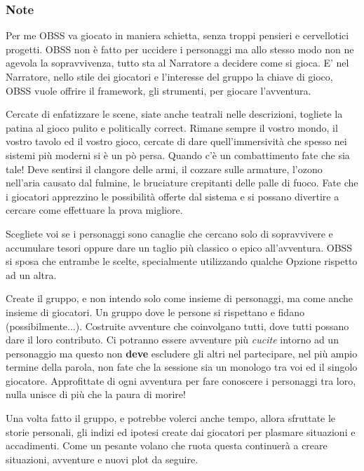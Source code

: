 \vfill
{\small

\begin{multicols}{2}

\subsubsection*{Note}

Per me OBSS va giocato in maniera schietta, senza troppi pensieri e cervellotici progetti. OBSS non è fatto per uccidere i personaggi ma allo stesso modo non ne agevola la sopravvivenza, tutto sta al Narratore a decidere come si gioca. E' nel Narratore, nello stile dei giocatori e l'interesse del gruppo la chiave di gioco, OBSS vuole offrire il framework, gli strumenti, per giocare l'avventura.

Cercate di enfatizzare le scene, siate anche teatrali nelle descrizioni, togliete la patina al gioco pulito e politically correct. Rimane sempre il vostro mondo, il vostro tavolo ed il vostro gioco, cercate di dare quell'immersività che spesso nei sistemi più moderni si è un pò persa.
Quando c'è un combattimento fate che sia tale! Deve sentirsi il clangore delle armi, il cozzare sulle armature, l'ozono nell'aria causato dal fulmine, le bruciature crepitanti delle palle di fuoco. Fate che i giocatori apprezzino le possibilità offerte dal sistema e si possano divertire a cercare come effettuare la prova migliore.

Scegliete voi se i personaggi sono canaglie che cercano solo di sopravvivere e accumulare tesori oppure dare un taglio più classico o epico all'avventura. OBSS si sposa che entrambe le scelte, specialmente utilizzando qualche Opzione rispetto ad un altra.

Create il gruppo, e non intendo solo come insieme di personaggi, ma come anche insieme di giocatori. Un gruppo dove le persone si rispettano e fidano (possibilmente...). Costruite avventure che coinvolgano tutti, dove tutti possano dare il loro contributo. Ci potranno essere avventure più \emph{cucite} intorno ad un personaggio ma questo non \textbf{deve} escludere gli altri nel partecipare, nel più ampio termine della parola, non fate che la sessione sia un monologo tra voi ed il singolo giocatore.
Approfittate di ogni avventura per fare conoscere i personaggi tra loro, nulla unisce di più che la paura di morire!

Una volta fatto il gruppo, e potrebbe volerci anche tempo, allora sfruttate le storie personali, gli indizi ed ipotesi create dai giocatori per plasmare situazioni e accadimenti. Come un pesante volano che ruota questa continuerà a creare situazioni, avventure e nuovi plot da seguire.


\end{multicols}}
